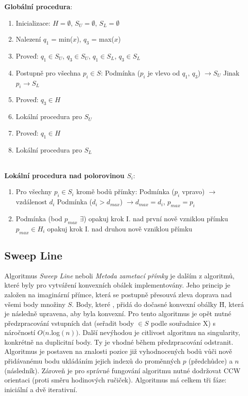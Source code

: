 \documentclass[a4paper, 12pt]{article}
\begin{document}
\textbf{Globální procedura}:
\begin{enumerate}
\item Inicializace: $H = \emptyset$, $S_U = \emptyset$, $S_L = \emptyset$ 
\item Nalezení $q_1$ = min($x$), $q_3$ = max($x$)
\item Proveď: $q_1 \in S_U$, $q_3 \in S_U$, $q_1 \in S_L$, $q_3 \in S_L$
\item Postupně pro všechna $p_i \in S$:
\subitem Podmínka ($p_i$ je vlevo od $q_1$, $q_3$) $\rightarrow S_U$
\subitem Jinak $ p_i \rightarrow S_L$
\item Proveď: $q_3 \in H$
\item Lokální procedura pro $S_U$
\item Proveď: $q_1 \in H$
\item Lokální procedura pro $S_L$
\end{enumerate}
~\\
\textbf{Lokální procedura nad polorovinou $S_i$}:
\begin{enumerate}[label=\Roman*.]
\item Pro všechny $p_i \in S_i$ kromě bodů přímky:
\subitem Podmínka ($p_i$ vpravo) $\rightarrow$ vzdálenost $d_i$
\subsubitem Podmínka ($d_i > d_{max}$) $\rightarrow d_{max} = d_i$, $p_{max} = p_i$
\item Podmínka (bod $p_{max}$ $\exists$) 
\subitem opakuj krok I. nad první nově vzniklou přímku
\subitem $p_{max} \in H_i$
\subitem opakuj krok I. nad druhou nově vzniklou přímku
\end{enumerate}

\subsection{Sweep Line}
Algoritmus \textit{Sweep Line} neboli \textit{Metoda zametací přímky} je dalším z algoritmů, které byly pro vytváření konvexních obálek implementovány. Jeho princip je založen na imaginární přímce, která se postupně přesouvá zleva doprava nad všemi body množiny $S$. Body, které , přidá do dočasné konvexní obálky \={H}, která je následně upravena, aby byla konvexní. Pro tento algoritmus je opět nutné předzpracování vstupních dat (seřadit body $\in S$ podle souřadnice X) s náročností $O(n.$log$(n))$. Další nevýhodou je citlivost algoritmu na singularity, konkrétně na duplicitní body. Ty je vhodné během předzpracování odstranit.\\ 

Algoritmus je postaven na znalosti pozice již vyhodnocených bodů vůči nově přidá\-vanému bodu ukládáním jejich indexů do proměnných $p$ (předchůdce) a $n$ (následník). Zároveň je pro správné fungování algoritmu nutné dodržovat CCW orientaci (proti směru hodinových ručiček). Algoritmus má celkem tři fáze: iniciální a dvě iterativní.\\
\end{document}
